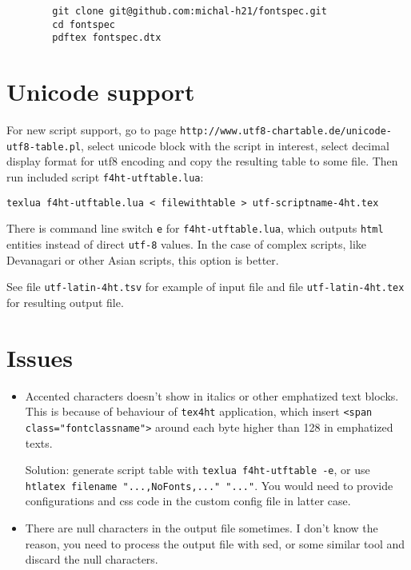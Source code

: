 \documentclass{article}
\begin{document}
	\begin{verbatim}
		git clone git@github.com:michal-h21/fontspec.git
		cd fontspec
		pdftex fontspec.dtx
	\end{verbatim} 
	
	\section{Unicode support}

	For new script support, go to page 
	\verb|http://www.utf8-chartable.de/unicode-utf8-table.pl|, 
	select unicode block with the script in interest, 
	select decimal display format for utf8 encoding and copy 
	the resulting table to some file. 
	Then run included script \verb|f4ht-utftable.lua|:

\begin{verbatim}
texlua f4ht-utftable.lua < filewithtable > utf-scriptname-4ht.tex
\end{verbatim} 

There is command line switch \verb|e| for \verb|f4ht-utftable.lua|, 
which outputs \verb|html| entities instead of direct \verb|utf-8| values. 
In the case of complex scripts, like Devanagari or other Asian scripts, 
this option is better. 

See file \verb|utf-latin-4ht.tsv| for example of input file and 
file \verb|utf-latin-4ht.tex| for resulting output file.

\section{Issues}

\begin{itemize}
	\item Accented characters doesn't show in italics 
		or other emphatized text blocks. 
		This is because of behaviour of \verb|tex4ht| application, 
		which insert \verb|<span class="fontclassname">| 
		around each byte higher than 128 in emphatized texts.

		Solution: generate script table with \verb|texlua f4ht-utftable -e|, 
		or use \verb|htlatex filename "...,NoFonts,..." "..."|. 
		You would need to provide configurations and css code in the 
		custom config file in latter case.
	\item There are null characters in the output file sometimes. 
		I don't know the reason, you need to process the output file with sed, 
		or some similar tool and discard the null characters.

\end{itemize} 
\end{document}
